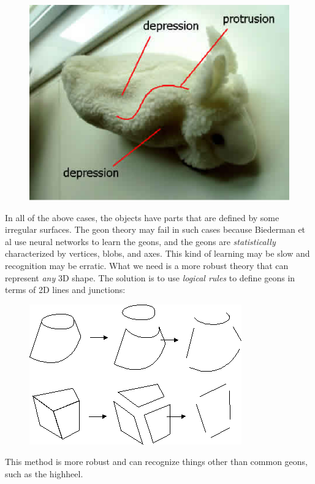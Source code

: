 \begin{figure}[H]
\centering
\includegraphics[scale=0.7,bb=0 0 448 336]{RabitAnalysis.eps}
\end{figure}

In all of the above cases, the objects have parts that are defined by some irregular surfaces. The geon theory may fail in such cases because Biederman et al use neural networks to learn the geons, and the geons are \emph{statistically} characterized by  vertices, blobs, and axes. This kind of learning may be slow and recognition may be erratic. What we need is a more robust theory that can represent \emph{any} 3D shape. The solution is to use \emph{logical rules} to define geons in terms of 2D lines and junctions:

\begin{figure}[H]
\centering
\includegraphics[scale=0.6, bb=0 0 346 228]{PolygonDecomposition.PNG}
\end{figure}

This method is more robust and can recognize things other than common geons, such as the highheel.

